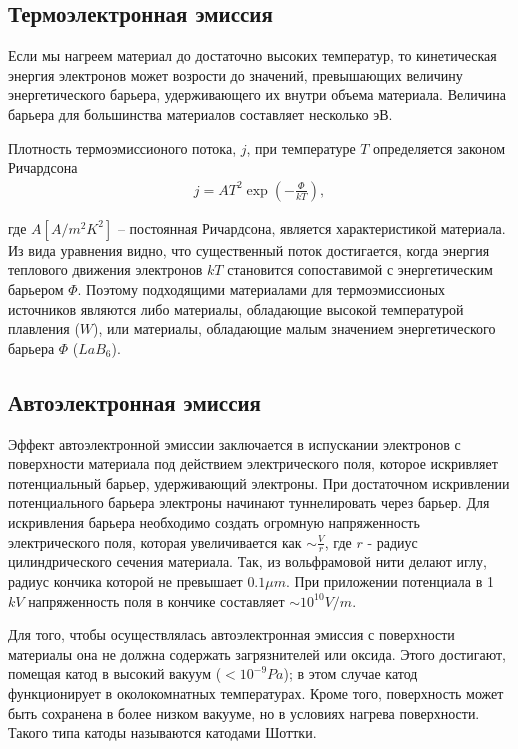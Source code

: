 \documentclass[12pt]{article}
\newcommand{\lb}{\left(}
\newcommand{\rb}{\right)}
\begin{document}
\subsection*{Термоэлектронная эмиссия}
Если мы нагреем материал до достаточно высоких температур, то кинетическая энергия электронов может возрости до значений, превышающих величину энергетического барьера, удерживающего их внутри объема материала. Величина барьера для большинства материалов составляет несколько эВ. \par
Плотность термоэмиссионого потока, $j$, при температуре $T$ определяется законом Ричардсона
\begin{gather}
j = A T^2 \exp \lb - \frac{\Phi}{kT} \rb, \label{richardson}
\end{gather}

где $A \left[ A/ m^2 K^2 \right]$ -- постоянная Ричардсона, является характеристикой материала. Из вида уравнения видно, что существенный поток достигается, когда энергия теплового движения электронов $kT$ становится сопоставимой с энергетическим барьером $\Phi$. Поэтому подходящими материалами для термоэмиссионых источников являются либо материалы, обладающие высокой температурой плавления ($W$), или материалы, обладающие малым значением энергетического барьера $\Phi$ ($LaB_6$).

\subsection*{Автоэлектронная эмиссия}
Эффект автоэлектронной эмиссии заключается в испускании электронов с поверхности материала под действием электрического поля, которое искривляет потенциальный барьер, удерживающий электроны. При достаточном искривлении потенциального барьера электроны начинают туннелировать через барьер. Для искривления барьера необходимо создать огромную напряженность электрического поля, которая увеличивается как $\sim \displaystyle \frac{V}{r}$, где $r$ - радиус цилиндрического сечения материала. Так, из вольфрамовой нити делают иглу, радиус кончика которой не превышает $0.1 \mu m$. При приложении потенциала в 1 $kV$ напряженность поля в кончике составляет $\sim 10^{10} V/m$. \par
Для того, чтобы осуществлялась автоэлектронная эмиссия с поверхности материалы она не должна содержать загрязнителей или оксида. Этого достигают, помещая катод в высокий вакуум ($ < 10^{-9} Pa$); в этом случае катод функционирует в околокомнатных температурах. Кроме того, поверхность может быть сохранена в более низком вакууме, но в условиях нагрева поверхности. Такого типа катоды называются катодами Шоттки.
\end{document}

